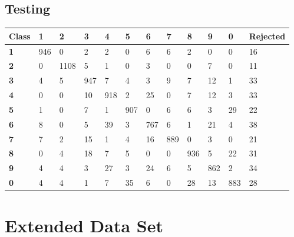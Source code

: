 \documentclass[
  a4paper,            %
  DIV=10,             %
  oneside,            %
  BCOR=5mm,           %
  parskip=half,       %
  numbers=noenddot,   %
  bibtotoc,           %
  listof=totoc        %
]{scrreprt}
\begin{document}
\subsection{Testing}
\begin{center}
  \begin{tabular}{|p{1cm}|p{1cm}|p{1cm}|p{1cm}|p{1cm}|p{1cm}|p{1cm}|p{1cm}|p{1cm}|p{1cm}|p{1cm}|p{1.7cm}|}
    \hline
    \textbf{Class} & \textbf{1} & \textbf{2} & \textbf{3} & \textbf{4} & \textbf{5} & \textbf{6} & \textbf{7} & \textbf{8} & \textbf{9} & \textbf{0} & \textbf{Rejected} \\
    \hline
    \textbf{1} & 946 & 0 & 2 & 2 & 0 & 6 & 6 & 2 & 0 & 0 & 16 \\
    \hline
    \textbf{2} & 0 & 1108 & 5 & 1 & 0 & 3 & 0 & 0 & 7 & 0 & 11 \\
    \hline
    \textbf{3} & 4 & 5 & 947 & 7 & 4 & 3 & 9 & 7 & 12 & 1 & 33 \\
    \hline
    \textbf{4} & 0 & 0 & 10 & 918 & 2 & 25 & 0 & 7 & 12 & 3 & 33 \\
    \hline
    \textbf{5} & 1 & 0 & 7 & 1 & 907 & 0 & 6 & 6 & 3 & 29 & 22 \\
    \hline
    \textbf{6} & 8 & 0 & 5 & 39 & 3 & 767 & 6 & 1 & 21 & 4 & 38 \\
    \hline
    \textbf{7} & 7 & 2 & 15 & 1 & 4 & 16 & 889 & 0 & 3 & 0 & 21 \\
    \hline
    \textbf{8} & 0 & 4 & 18 & 7 & 5 & 0 & 0 & 936 & 5 & 22 & 31 \\
    \hline
    \textbf{9} & 4 & 4 & 3 & 27 & 3 & 24 & 6 & 5 & 862 & 2 & 34 \\
    \hline
    \textbf{0} & 4 & 4 & 1 & 7 & 35 & 6 & 0 & 28 & 13 & 883 & 28 \\
    \hline
  \end{tabular}
\end{center}
\section{Extended Data Set}
\end{document}
